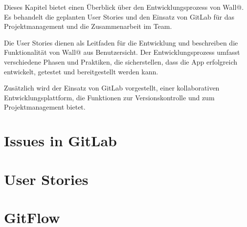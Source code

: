 
Dieses Kapitel bietet einen Überblick über den Entwicklungsprozess von Wall@. 
Es behandelt die geplanten User Stories und den Einsatz von GitLab für das Projektmanagement und die Zusammenarbeit im Team.

Die User Stories dienen als Leitfaden für die Entwicklung und beschreiben die Funktionalität von Wall@ aus Benutzersicht. 
Der Entwicklungsprozess umfasst verschiedene Phasen und Praktiken, die sicherstellen, dass die App erfolgreich entwickelt, getestet und bereitgestellt werden kann.

Zusätzlich wird der Einsatz von GitLab vorgestellt, einer kollaborativen Entwicklungsplattform, die Funktionen zur Versionskontrolle und zum Projektmanagement bietet.

\section{Issues in GitLab}

\section{User Stories}

\section{GitFlow}

